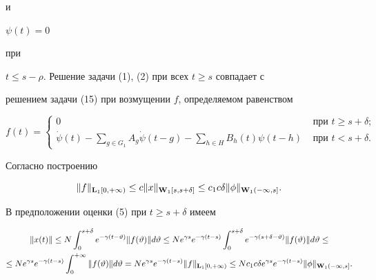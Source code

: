 и


$\psi(t)=0$ 


при


$t\le s-\rho$. Решение задачи (1), (2) при всех $t\ge s$ совпадает с


решением задачи (15) при возмущении $f$, определяемом равенством


$$


f(t)=


\begin{cases}


0 & \text{ при } t\ge s+\delta;\\


%


\Dot\psi(t)-\sum\limits_{g\in G_1}A_g\Dot\psi(t-g)-\sum\limits_{h\in


H}B_h(t)\psi(t-h) & \text{ при }t<s+\delta.


\end{cases}


$$


%


Согласно построению


$$


\|f\|_{\bold L_1[0,+\infty)}\le c\|x\|_{\bold W_1[s,s+\delta]}\le


c_1c\delta\|\phi\|_{\bold W_1(-\infty,s]}.


$$


В предположении оценки (5) при $t\ge s+\delta$ имеем


%


\begin{multline*}


\|x(t)\|\le N\int_0^{s+


\delta}e^{-\gamma(t-\vartheta)}\|f(\vartheta)\|d\vartheta\le


Ne^{\gamma s}e^{-\gamma(t-s)}\int_0^{s+\delta}e^{


-\gamma(s+\delta-\vartheta)}\|f(\vartheta)\|d\vartheta\le \\


%


\le Ne^{\gamma


s}e^{-\gamma(t-s)}\int_0^{+\infty}\|f(\vartheta)\|d\vartheta


=Ne^{\gamma s}e^{-\gamma(t-s)}\|f\|_{\bold L_1[0,+\infty)}\le 


Nc_1c\delta e^{\gamma


s}e^{-\gamma(t-s)}\|\phi\|_{\bold W_1(-\infty,s]}.


\end{multline*}


